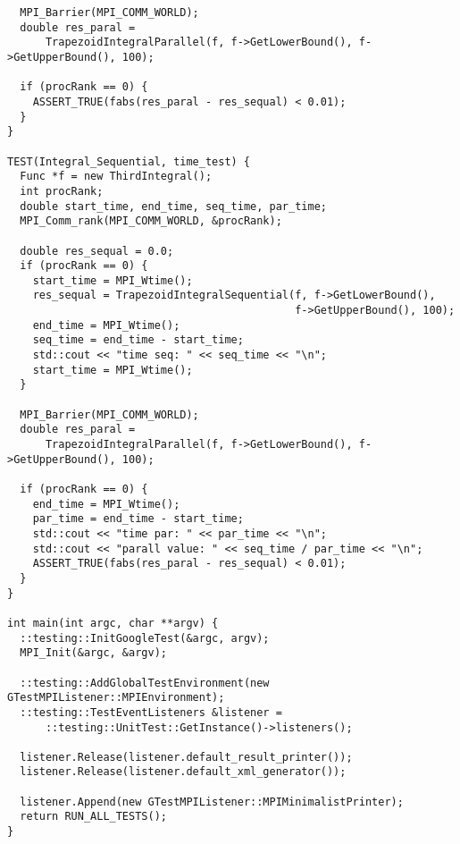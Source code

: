 \documentclass{report}
\begin{document}
\begin{lstlisting}
  MPI_Barrier(MPI_COMM_WORLD);
  double res_paral =
      TrapezoidIntegralParallel(f, f->GetLowerBound(), f->GetUpperBound(), 100);

  if (procRank == 0) {
    ASSERT_TRUE(fabs(res_paral - res_sequal) < 0.01);
  }
}

TEST(Integral_Sequential, time_test) {
  Func *f = new ThirdIntegral();
  int procRank;
  double start_time, end_time, seq_time, par_time;
  MPI_Comm_rank(MPI_COMM_WORLD, &procRank);

  double res_sequal = 0.0;
  if (procRank == 0) {
    start_time = MPI_Wtime();
    res_sequal = TrapezoidIntegralSequential(f, f->GetLowerBound(),
                                             f->GetUpperBound(), 100);
    end_time = MPI_Wtime();
    seq_time = end_time - start_time;
    std::cout << "time seq: " << seq_time << "\n";
    start_time = MPI_Wtime();
  }

  MPI_Barrier(MPI_COMM_WORLD);
  double res_paral =
      TrapezoidIntegralParallel(f, f->GetLowerBound(), f->GetUpperBound(), 100);

  if (procRank == 0) {
    end_time = MPI_Wtime();
    par_time = end_time - start_time;
    std::cout << "time par: " << par_time << "\n";
    std::cout << "parall value: " << seq_time / par_time << "\n";
    ASSERT_TRUE(fabs(res_paral - res_sequal) < 0.01);
  }
}

int main(int argc, char **argv) {
  ::testing::InitGoogleTest(&argc, argv);
  MPI_Init(&argc, &argv);

  ::testing::AddGlobalTestEnvironment(new GTestMPIListener::MPIEnvironment);
  ::testing::TestEventListeners &listener =
      ::testing::UnitTest::GetInstance()->listeners();

  listener.Release(listener.default_result_printer());
  listener.Release(listener.default_xml_generator());

  listener.Append(new GTestMPIListener::MPIMinimalistPrinter);
  return RUN_ALL_TESTS();
}
\end{lstlisting}
\end{document}
